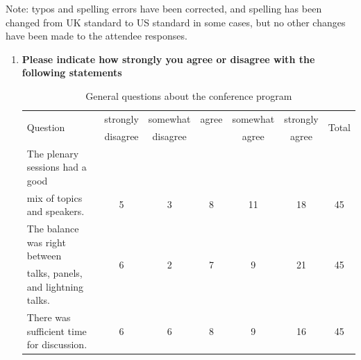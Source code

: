 Note: typos and spelling errors have been corrected, and spelling has been changed from UK standard to US standard in some cases, but no other changes have been made to the attendee responses.

\begin{enumerate}
\item \textbf{Please indicate how strongly you agree or disagree with the following statements}

\begin{table}[h!]
\centering
\caption{General questions about the conference program}
\label{tab:survey_program}
{\scriptsize
\begin{tabular}{@{}lcccccc@{}}
\toprule
\multirow{2}{*}{Question} & strongly & somewhat & agree & somewhat & strongly &
\multirow{2}{*}{Total} \\
& disagree & disagree & & agree & agree & \\
\midrule
\rowcolor{lightgray} The plenary sessions had a good & & & & & & \\
\rowcolor{lightgray} mix of topics and speakers. &
\multirow{-2}{*}{5} &
\multirow{-2}{*}{3} &
\multirow{-2}{*}{8} &
\multirow{-2}{*}{11} &
\multirow{-2}{*}{18} &
\multirow{-2}{*}{45} \\
The balance was right between &
\multirow{2}{*}{6} &
\multirow{2}{*}{2} &
\multirow{2}{*}{7} &
\multirow{2}{*}{9} &
\multirow{2}{*}{21} &
\multirow{2}{*}{45} \\
talks, panels, and lightning talks. & & & & & & \\
\rowcolor{lightgray} There was sufficient time for discussion. &
6 &
6 &
8 &
9 &
16 &
45 \\
\bottomrule
\end{tabular}
}
\end{table}




\end{enumerate}
